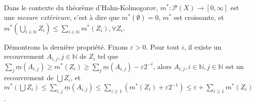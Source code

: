 \documentclass[10pt,a4paper,notitlepage ]{report}
\begin{document}
\begin{propriete}
	Dans le contexte du théorème d'Hahn-Kolmogorov, $m^* : \mathcal P(X) \rightarrow [0,\infty]$ est une \emph{mesure extérieure}, c'est à dire que $m^*(\emptyset) = 0$, $m^*$ est croissante, et $m^*\left(\underset{i\in \mathbb N} \bigcup Z_i\right) \le \underset{i\in\mathbb N}\sum m^*(Z_i), \forall Z_i$.
\end{propriete}

\begin{demo}
	Démontrons la dernière propriété. Fixons $\varepsilon > 0$. Pour tout $i$, il existe un recouvrement $A_{i,j}, j\in \mathbb N$ de $Z_i$ tel que $\underset j \sum \underline m(A_{i,j}) \ge m^*(Z_i) \ge \underset j \sum \underline m (A_{i,j}) - \varepsilon 2^{-i}$, alors $A_{i,j}, i\in \mathbb N, j \in \mathbb N$ est un recouvrement de $\bigcup Z_i$, et $m^*(\bigcup Z_i) \le \underset {i,j} \sum \underline m (A_{i,j}) \le \underset {i \ge 1} \sum (m^*(Z_i) + \varepsilon 2^{-1}) \le \varepsilon + \underset {i \ge 1} \sum m^*(Z_i)$.
\end{demo}
\end{document}
